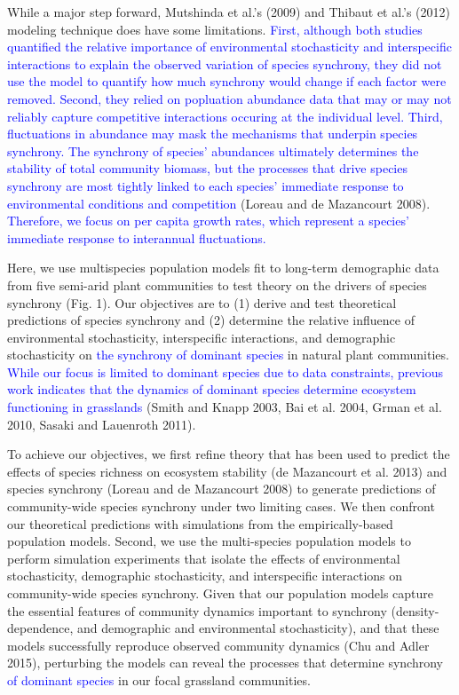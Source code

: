 \documentclass[11pt,]{article}
\begin{document}
While a major step forward, Mutshinda et al.'s (2009) and Thibaut et
al.'s (2012) modeling technique does have some limitations.
\textcolor{blue}{First, although both studies quantified the relative importance of environmental stochasticity and interspecific interactions to explain the observed variation of species synchrony, they did not use the model to quantify how much synchrony would change if each factor were removed.
Second, they relied on popluation abundance data that may or may not reliably capture competitive interactions occuring at the individual level.
Third, fluctuations in abundance may mask the mechanisms that underpin species synchrony.
The synchrony of species' abundances ultimately determines the stability of total community biomass, but the processes that drive species synchrony are most tightly linked to each species' immediate response to environmental conditions and competition}
(Loreau and {{de Mazancourt}} 2008).
\textcolor{blue}{Therefore, we focus on per capita growth rates, which represent a species' immediate response to interannual fluctuations.}

Here, we use multispecies population models fit to long-term demographic
data from five semi-arid plant communities to test theory on the drivers
of species synchrony (Fig. 1). Our objectives are to (1) derive and test
theoretical predictions of species synchrony and (2) determine the
relative influence of environmental stochasticity, interspecific
interactions, and demographic stochasticity on
\textcolor{blue}{the synchrony of dominant species} in natural plant
communities.
\textcolor{blue}{While our focus is limited to dominant species due to data constraints, previous work indicates that the dynamics of dominant species determine ecosystem functioning in grasslands}
(Smith and Knapp 2003, Bai et al. 2004, Grman et al. 2010, Sasaki and
Lauenroth 2011).

To achieve our objectives, we first refine theory that has been used to
predict the effects of species richness on ecosystem stability ({{de
Mazancourt}} et al. 2013) and species synchrony (Loreau and {{de
Mazancourt}} 2008) to generate predictions of community-wide species
synchrony under two limiting cases. We then confront our theoretical
predictions with simulations from the empirically-based population
models. Second, we use the multi-species population models to perform
simulation experiments that isolate the effects of environmental
stochasticity, demographic stochasticity, and interspecific interactions
on community-wide species synchrony. Given that our population models
capture the essential features of community dynamics important to
synchrony (density-dependence, and demographic and environmental
stochasticity), and that these models successfully reproduce observed
community dynamics (Chu and Adler 2015), perturbing the models can
reveal the processes that determine synchrony
\textcolor{blue}{of dominant species} in our focal grassland
communities.
\end{document}
